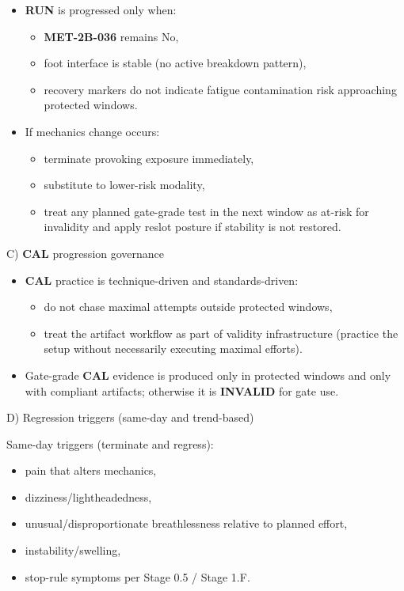 \documentclass[10pt]{article}
\begin{document}
\begin{itemize}
\item \textbf{RUN} is progressed only when:
  \begin{itemize}
  \item \textbf{MET-2B-036} remains No,
  \item foot interface is stable (no active breakdown pattern),
  \item recovery markers do not indicate fatigue contamination risk approaching protected windows.
  \end{itemize}
\item If mechanics change occurs:
  \begin{itemize}
  \item terminate provoking exposure immediately,
  \item substitute to lower-risk modality,
  \item treat any planned gate-grade test in the next window as at-risk for invalidity and apply reslot posture if stability is not restored.
  \end{itemize}
\end{itemize}

C) \textbf{CAL} progression governance

\begin{itemize}
\item \textbf{CAL} practice is technique-driven and standards-driven:
  \begin{itemize}
  \item do not chase maximal attempts outside protected windows,
  \item treat the artifact workflow as part of validity infrastructure (practice the setup without necessarily executing maximal efforts).
  \end{itemize}
\item Gate-grade \textbf{CAL} evidence is produced only in protected windows and only with compliant artifacts; otherwise it is \textbf{INVALID} for gate use.
\end{itemize}

D) Regression triggers (same-day and trend-based)

Same-day triggers (terminate and regress):

\begin{itemize}
\item pain that alters mechanics,
\item dizziness/lightheadedness,
\item unusual/disproportionate breathlessness relative to planned effort,
\item instability/swelling,
\item stop-rule symptoms per Stage 0.5 / Stage 1.F.
\end{itemize}
\end{document}
